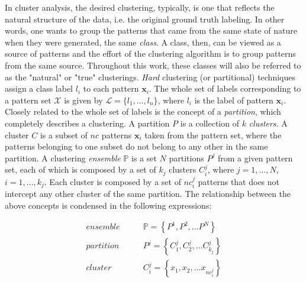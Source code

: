 In cluster analysis, the desired clustering, typically, is one that reflects the natural structure of the data, i.e. the original ground truth labeling.
In other words, one wants to group the patterns that came from the same state of nature when they were generated, the same \emph{class}.
A class, then, can be viewed as a source of patterns and the effort of the clustering algorithm is to group patterns from the same source.
Throughout this work, these classes will also be referred to as the "natural" or "true" clusterings.
\emph{Hard} clustering (or partitional) techniques assign a class label $l_i$ to each pattern $\mathbf{x}_i$.
The whole set of labels corresponding to a pattern set $\mathcal{X}$ is given by $\mathcal{L} = \{ l_1, \ldots, l_n \}$, where $l_i$ is the label of pattern $\mathbf{x}_i$.
Closely related to the whole set of labels is the concept of a \emph{partition}, which completely describes a clustering.
A partition $P$ is a collection of $k$ \emph{clusters}.
A cluster $C$ is a subset of $nc$ patterns $\mathbf{x}_i$ taken from the pattern set, where the patterns belonging to one subset do not belong to any other in the same partition.
A clustering \emph{ensemble} $\mathbb{P}$ is a set $N$ partitions $P^j$ from a given pattern set, each of which is composed by a set of $k_j$ clusters $C^j_i$, where $j=1, \ldots, N$, $i=1, \ldots, k_j$.
Each cluster is composed by a set of $nc^j_i$ patterns that does not intercept any other cluster of the same partition.
The relationship between the above concepts is condensed in the following expressions:

\begin{align*}
    ensemble \qquad & \mathbb{P} = \left \{   P^1, P^2, \ldots P^N   \right \}  \\
    partition \qquad & P^j = \left \{   C^j_1, C^j_2, \ldots C^{j}_{k_j}   \right \}  \\
    cluster \qquad & C^j_i = \left \{   x_1, x_2, \ldots x_{nc^j_i}   \right \}
\end{align*}





